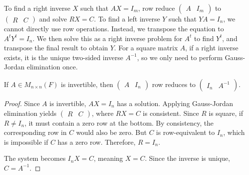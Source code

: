 \documentclass[../linear_algebra_and_groups.tex]{subfiles}
\begin{document}
\begin{remark}
    To find a right inverse $X$ such that $AX=I_m$, row reduce $\left(\begin{array}{c|c} A & I_m \end{array}\right)$ to $\left(\begin{array}{c|c} R & C \end{array}\right)$ and solve $RX=C$. To find a left inverse $Y$ such that $YA=I_n$, we cannot directly use row operations. Instead, we transpose the equation to $A^t Y^t = I_n$. We then solve this as a right inverse problem for $A^t$ to find $Y^t$, and transpose the final result to obtain $Y$. For a square matrix $A$, if a right inverse exists, it is the unique two-sided inverse $A^{-1}$, so we only need to perform Gauss-Jordan elimination once.
\end{remark}

\begin{theorem}
\label{thm:inverserowequiv}
    \begin{shaded*}
        If $A \in M_{n\times n}(F)$ is invertible, then $\left(\begin{array}{c|c} A & I_n \end{array}\right)$ row reduces to $\left(\begin{array}{c|c} I_n & A^{-1} \end{array}\right)$.
    \end{shaded*}
\end{theorem}
\begin{proof}
    Since $A$ is invertible, $AX=I_n$ has a solution. Applying Gauss-Jordan elimination yields $\left(\begin{array}{c|c} R & C \end{array}\right)$, where $RX=C$ is consistent. Since $R$ is square, if $R \neq I_n$, it must contain a zero row at the bottom. By consistency, the corresponding row in $C$ would also be zero. But $C$ is row-equivalent to $I_n$, which is impossible if $C$ has a zero row. Therefore, $R = I_n$. 
    
    The system becomes $I_n X = C$, meaning $X = C$. Since the inverse is unique, $C = A^{-1}$.
    \qedhere
\end{proof}
\end{document}
